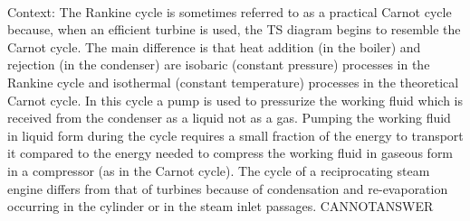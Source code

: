 \documentclass[11pt,a4paper, onecolumn]{article}
\begin{document}
\\ Context: The Rankine cycle is sometimes referred to as a practical Carnot cycle because, when an efficient turbine is used, the TS diagram begins to resemble the Carnot cycle. The main difference is that heat addition (in the boiler) and rejection (in the condenser) are isobaric (constant pressure) processes in the Rankine cycle and isothermal (constant temperature) processes in the theoretical Carnot cycle. In this cycle a pump is used to pressurize the working fluid which is received from the condenser as a liquid not as a gas. Pumping the working fluid in liquid form during the cycle requires a small fraction of the energy to transport it compared to the energy needed to compress the working fluid in gaseous form in a compressor (as in the Carnot cycle). The cycle of a reciprocating steam engine differs from that of turbines because of condensation and re-evaporation occurring in the cylinder or in the steam inlet passages. CANNOTANSWER
\end{document}
